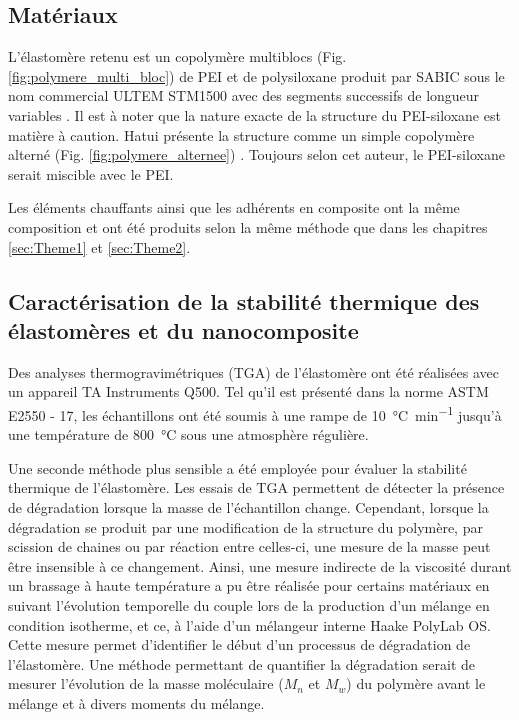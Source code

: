 \subsection{Matériaux}

L'élastomère retenu est un copolymère multiblocs (Fig. \ref{fig:polymere_multi_bloc}) de PEI et de polysiloxane  produit par SABIC sous le nom commercial ULTEM STM1500 avec des segments successifs de longueur variables  \cite{mark2013,Holden2002}. 
Il est à noter que la nature exacte de la structure du PEI-siloxane est matière à caution. 
Hatui présente la structure comme un simple copolymère alterné (Fig. \ref{fig:polymere_alternee}) \cite{Hatui2015}. 
Toujours selon cet auteur, le PEI-siloxane serait miscible avec le PEI. 

Les éléments chauffants ainsi que les adhérents en composite ont la même composition et ont été produits selon la même méthode que dans les chapitres \ref{sec:Theme1} et \ref{sec:Theme2}. 

\subsection{Caractérisation de la stabilité thermique des élastomères et du nanocomposite}

Des analyses thermogravimétriques (TGA) de l'élastomère ont été réalisées avec un appareil TA Instruments Q500. 
Tel qu'il est présenté dans la norme ASTM E2550 - 17, les échantillons ont été soumis à une rampe de \SI[locale=FR]{10}{\celsius\per\minute} jusqu'à une température de \SI[locale=FR]{800}{\celsius} sous une atmosphère régulière. 

Une seconde méthode plus sensible a été employée pour évaluer la stabilité thermique de l'élastomère. 
Les essais de TGA permettent de détecter la présence de dégradation lorsque la masse de l'échantillon change. 
Cependant, lorsque la dégradation se produit par une modification de la structure du polymère, par scission de chaines ou par réaction entre celles-ci, une mesure de la masse peut être insensible à ce changement. 
Ainsi, une mesure indirecte de la viscosité durant un brassage à haute température a pu être réalisée pour certains matériaux en suivant l'évolution temporelle du couple lors de la production d'un mélange en condition isotherme, et ce, à l'aide d'un mélangeur interne Haake PolyLab OS. 
Cette mesure permet d'identifier le début d'un processus de dégradation de l'élastomère. 
Une méthode permettant de quantifier la dégradation serait de mesurer l'évolution de la masse moléculaire ($M_n$ et $M_w$) du polymère avant le mélange et à divers moments du mélange. 

